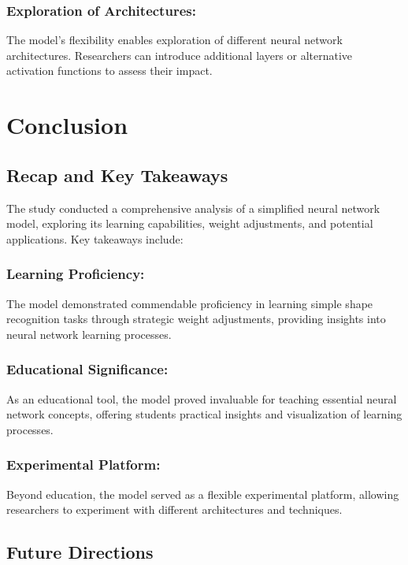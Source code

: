 \documentclass{article}
\begin{document}
\subsubsection*{Exploration of Architectures:}
The model's flexibility enables exploration of different neural network architectures. Researchers can introduce additional layers or alternative activation functions to assess their impact.

\section{Conclusion}

\subsection{Recap and Key Takeaways}

The study conducted a comprehensive analysis of a simplified neural network model, exploring its learning capabilities, weight adjustments, and potential applications. Key takeaways include:

\subsubsection*{Learning Proficiency:}
The model demonstrated commendable proficiency in learning simple shape recognition tasks through strategic weight adjustments, providing insights into neural network learning processes.

\subsubsection*{Educational Significance:}
As an educational tool, the model proved invaluable for teaching essential neural network concepts, offering students practical insights and visualization of learning processes.

\subsubsection*{Experimental Platform:}
Beyond education, the model served as a flexible experimental platform, allowing researchers to experiment with different architectures and techniques.

\subsection{Future Directions}
\end{document}
